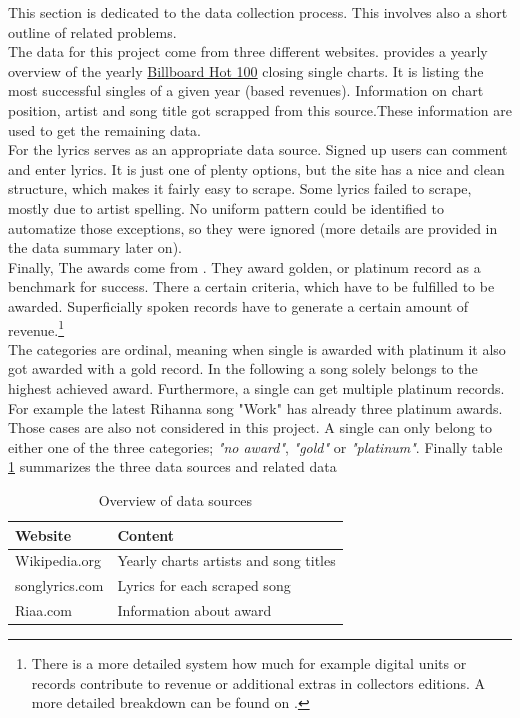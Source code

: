 \documentclass[12pt,a4paper,bibliography=totocnumbered,listof=totocnumbered]{scrartcl}
\begin{document}
This section is dedicated to the data collection process. This involves also a short outline of related problems.\\ 
The data for this project come from three different websites. \cite{wiki} provides a yearly overview of the yearly \href{https://en.wikipedia.org/wiki/Billboard_Year-End_Hot_100_singles_of_2015}{Billboard Hot 100} closing single charts. It is listing the most successful singles of a given year (based revenues). Information on chart position, artist and song title got scrapped from this source.These information are used to get the remaining data. \\ 
For the lyrics \cite{songlyrics} serves as an appropriate data source. Signed up users can comment and enter lyrics. It is just one of plenty options, but the site has a nice and clean structure, which makes it fairly easy to scrape. Some lyrics failed to scrape, mostly due to artist spelling. No uniform pattern could be identified to automatize those exceptions, so they were ignored (more details are provided in the data summary later on). \\
Finally, The awards come from \cite{riaa}. They award golden, or platinum record as a benchmark for success. There a certain criteria, which have to be fulfilled to be awarded. Superficially spoken records have to generate a certain amount of revenue.\footnote{There is a more detailed system how much for example digital units or records contribute to revenue or additional extras in collectors editions. A more detailed breakdown can be found on \cite{riaa}.}\\
The categories are ordinal, meaning when single is awarded with platinum it also got awarded with a gold record. In the following a song solely belongs to the highest achieved award. Furthermore, a single can get multiple platinum records. For example the latest Rihanna song "Work" has already three platinum awards. Those cases are also not considered in this project. A single can only belong to either one of the three categories; \textit{"no award"}, \textit{"gold"} or \textit{"platinum"}.
Finally table \ref{tab:ov} summarizes the three data sources and related data

\begin{table}[H]
	\centering
	\small
	\begin{tabular}{l l}
		\toprule 
		\textbf{Website} & \textbf{Content} \\
		\hline
		Wikipedia.org & Yearly charts artists and song titles \\
		songlyrics.com & Lyrics for each scraped song \\
		Riaa.com & Information about award	\\
		\bottomrule
	\end{tabular}
	\caption{Overview of data sources}
	\label{tab:ov}
\end{table}
\end{document}

